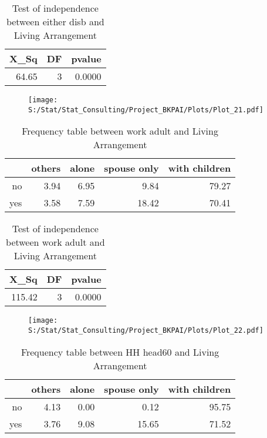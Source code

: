 \documentclass[11pt]{article}
\begin{document}
\begin{table}[H]
\centering
\begin{tabular}{rrr}
  \hline
X\_Sq & DF & pvalue \\ 
  \hline
64.65 & 3 & 0.0000 \\ 
   \hline
\end{tabular}
\caption{Test of independence between either disb and Living Arrangement} 
\end{table}
\begin{center}
\begin{figure}[H]
\texttt{[image: S:/Stat/Stat\_Consulting/Project\_BKPAI/Plots/Plot\_21.pdf]}

\end{figure}
\end{center}
\begin{table}[H]
\centering
\begin{tabular}{rrrrr}
  \hline
 & others & alone & spouse only & with children \\ 
  \hline
no & 3.94 & 6.95 & 9.84 & 79.27 \\ 
  yes & 3.58 & 7.59 & 18.42 & 70.41 \\ 
   \hline
\end{tabular}
\caption{Frequency table between work adult and Living Arrangement} 
\end{table}
\begin{table}[H]
\centering
\begin{tabular}{rrr}
  \hline
X\_Sq & DF & pvalue \\ 
  \hline
115.42 & 3 & 0.0000 \\ 
   \hline
\end{tabular}
\caption{Test of independence between work adult and Living Arrangement} 
\end{table}
\begin{center}
\begin{figure}[H]
\texttt{[image: S:/Stat/Stat\_Consulting/Project\_BKPAI/Plots/Plot\_22.pdf]}

\end{figure}
\end{center}
\begin{table}[H]
\centering
\begin{tabular}{rrrrr}
  \hline
 & others & alone & spouse only & with children \\ 
  \hline
no & 4.13 & 0.00 & 0.12 & 95.75 \\ 
  yes & 3.76 & 9.08 & 15.65 & 71.52 \\ 
   \hline
\end{tabular}
\caption{Frequency table between HH head60 and Living Arrangement} 
\end{table}
\end{document}
